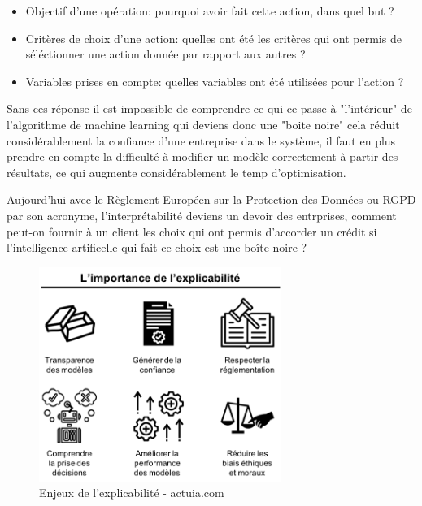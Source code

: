             \begin{itemize}
                \item Objectif d'une opération: pourquoi avoir fait cette action, 
                dans quel but ? \newline 
                \item Critères de choix d'une action: quelles ont été les critères 
                qui ont permis de séléctionner une action donnée par rapport aux 
                autres ? \newline
                \item Variables prises en compte: quelles variables ont été utilisées
                pour l'action ? \newline 
            \end{itemize}

            Sans ces réponse il est impossible de comprendre ce qui ce passe à "l'intérieur"
            de l'algorithme de machine learning qui deviens donc une "boite noire"
            cela réduit considérablement la confiance d'une entreprise dans le système,
            il faut en plus prendre en compte la difficulté à modifier un modèle correctement à 
            partir des résultats, ce qui augmente considérablement le temp d'optimisation.
            \newline

            Aujourd'hui avec le Règlement Européen sur la Protection des Données ou RGPD par son 
            acronyme, l'interprétabilité deviens un devoir des entrprises, comment 
            peut-on fournir à un client les choix qui ont permis d'accorder un crédit
            si l'intelligence artificelle qui fait ce choix est une boîte noire ?



            
            \begin{figure}[H]
                \centering
                \includegraphics[width=0.7\textwidth]{Images/explicabilite}
                \caption{Enjeux de l'explicabilité - actuia.com}
                \label{fig:explicability}
            \end{figure}



